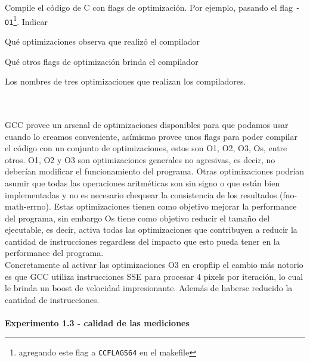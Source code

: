 Compile el código de C con flags de optimización. Por ejemplo, pasando el flag 
\verb|-O1|\footnote{agregando este flag a \texttt{CCFLAGS64} en el makefile}. 
Indicar
\begin{inparaenum}
    \item Qué optimizaciones observa que realizó el compilador
    \item Qué otros flags de optimización brinda el compilador
    \item Los nombres de tres optimizaciones que realizan los compiladores.
\end{inparaenum}\\
\\
\indent GCC provee un arsenal de optimizaciones disponibles para que podamos usar cuando lo creamos conveniente, asímismo provee unos flags para poder compilar el código con un conjunto de optimizaciones, estos son O1, O2, O3, Os, entre otros. O1, O2 y O3 son optimizaciones generales no agresivas, es decir, no deberían modificar el funcionamiento del programa. Otras optimizaciones podrían asumir que todas las operaciones aritméticas son sin signo o que están bien implementadas y no es necesario chequear la consistencia de los resultados (fno-math-errno). Estas optimizaciones tienen como objetivo mejorar la performance del programa, sin embargo Os tiene como objetivo reducir el tamaño del ejecutable, es decir, activa todas las optimizaciones que contribuyen a reducir la cantidad de instrucciones regardless del impacto que esto pueda tener en la performance del programa. \\
\indent Concretamente al activar las optimizaciones O3 en cropflip el cambio más notorio es que GCC utiliza instrucciones SSE para procesar 4 pixels por iteración, lo cual le brinda un boost de velocidad impresionante. Además de haberse reducido la cantidad de instrucciones. \\
\\
\vspace*{0.3cm} \noindent
\textbf{Experimento 1.3 - calidad de las mediciones}

